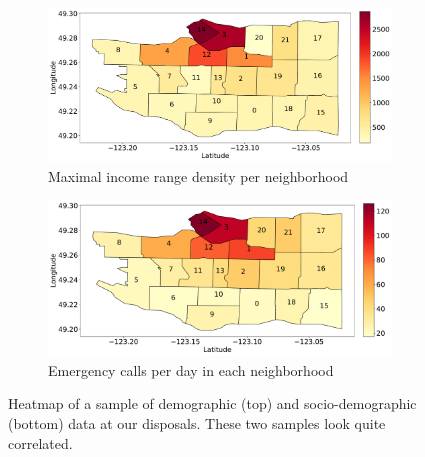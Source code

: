 \begin{figure}
    \begin{center}
        \begin{subfigure}{0.65\columnwidth}
            \includegraphics[width=\columnwidth]{figures/data_coll_char/Richness_80k+.pdf}
             \caption{Maximal income range density per neighborhood
             \vspace{0.5cm}}
            \label{fig:8_3_richness-per-zone}
        \end{subfigure}
        \begin{subfigure}{0.65\columnwidth}
            \includegraphics[width=\columnwidth]{figures/data_coll_char/emergencies.pdf}
             \caption{Emergency calls per day in each neighborhood}
            \label{fig:8_3_calls-per-zone}
        \end{subfigure}
        \caption{Heatmap of a sample of demographic (top) and socio-demographic (bottom) data at our disposals. These two samples look quite correlated.}
        \label{}
    \end{center}
\end{figure}

